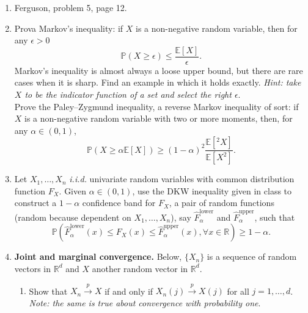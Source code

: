 \documentclass[12pt]{article}
\begin{document}
\begin{enumerate}
\item Ferguson, problem 5, page 12.\\

\color{black}

\item Prova Markov's inequality: if $X$ is a non-negative random variable, then for any $\epsilon > 0$
\[
\mathbb{P} ( X \geq \epsilon) \leq \frac{\mathbb{E}[X]}{\epsilon}.
\]
Markov's inequality is almost always a loose upper bound, but there are rare cases when it is sharp. Find an example in which it holds exactly. {\it Hint: take $X$ to be the indicator function of a set and select the right $\epsilon$}.\\
Prove the Paley–Zygmund inequality, a reverse Markov inequality of sort: if $X$ is a non-negative random variable with two or more moments, then, for any $\alpha \in (0,1)$,
\[
\mathbb{P} ( X \geq \alpha \mathbb{E}[X]) \geq (1 - \alpha)^2 \frac{\mathbb{E}[^2X]}{\mathbb{E}[X^2]}.
\] 


\color{black}

\item Let $X_1,\ldots,X_n$ {\it i.i.d.} univariate random variables with common distribution function $F_X$. Given $\alpha \in (0,1)$, use the DKW inequality given in class to construct a $1 - \alpha$ confidence band for $F_X$, a pair of random functions (random because dependent on $X_1,\ldots,X_n$), say $\hat{F}^{\mathrm{lower}}_\alpha$ and $\hat{F}^{\mathrm{upper}}_\alpha$, such that
\[
\mathbb{P} \left( \hat{F}^{\mathrm{lower}}_\alpha(x) \leq F_X(x) \leq \hat{F}^{\mathrm{upper}}_\alpha(x), \forall x \in \mathbb{R}  \right) \geq 1 - \alpha.
 \]
\color{black}





\item {\bf Joint and marginal convergence.} Below, $\{ X_n \}$ is a sequence of random vectors in $\mathbb{R}^d$ and $X$ another random vector in $\mathbb{R}^d$.
 \begin{enumerate}
 \item Show that $X_n \stackrel{p}{\rightarrow} X$ if and only if $X_n(j) \stackrel{p}{\rightarrow} X(j)$ for all $j=1,\ldots,d$. {\it Note: the same is true about convergence with probability one}.\\



\end{enumerate}
\end{enumerate}
\end{document}
